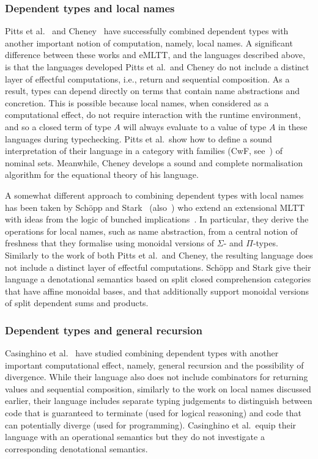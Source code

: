 \subsubsection*{Dependent types and local names}

Pitts et al.~\cite{Pitts:NominalMLTT} and Cheney~\cite{Cheney:DepNomTypeTheory} have successfully combined dependent types with another important notion of computation, namely, local names.
A significant difference between these works and eMLTT, and the languages described above, is that the languages developed Pitts et al.~and Cheney do not include a distinct layer of effectful computations, i.e., return and sequential composition. 
As a result, types can depend directly on terms that contain name abstractions and concretion.
This is possible because local names, when considered as a computational effect, do not require interaction with the runtime environment, and so a closed term of type $A$ will always evaluate to a value of type $A$ in these languages during typechecking.
Pitts et al.~show how to define a sound interpretation of their language in a category with families (CwF, see~\cite{Hofmann:SyntaxAndSemantics}) of nominal sets.
Meanwhile, Cheney develops a sound and complete normalisation algorithm for the equational theory of his language. 

A somewhat different approach to combining dependent types with local names has been taken by Sch\"{o}pp and Stark~\cite{Schopp:DTTWithNames} (also~\cite{Schopp:Thesis}) who extend an extensional MLTT with ideas from the logic of bunched implications~\cite{Pym:BunchedImplications}. In particular, they derive the operations for local names, such as name abstraction, from a central notion of freshness that they formalise using monoidal versions of $\Sigma$- and $\Pi$-types. Similarly to the work of both Pitts et al.~and Cheney, the resulting language does not include a distinct layer of effectful computations. Sch\"{o}pp and Stark  give their language a denotational semantics based on split closed comprehension categories that have affine monoidal bases, and that additionally support monoidal versions of split dependent sums and products.

\subsubsection*{Dependent types and general recursion}

Casinghino et al.~\cite{Casinghino:CombiningProofs} have studied combining dependent types with another important computational effect, namely, general recursion and the possibility of divergence. 
While their language also does not include combinators for returning values and sequential composition, similarly to the work on local names discussed earlier, their language includes separate typing judgements to distinguish between code that is guaranteed to terminate (used for logical reasoning) and code that can potentially diverge (used for programming). 
Casinghino et al.~equip their language with an operational semantics but they do not investigate a corresponding denotational semantics. 
 
